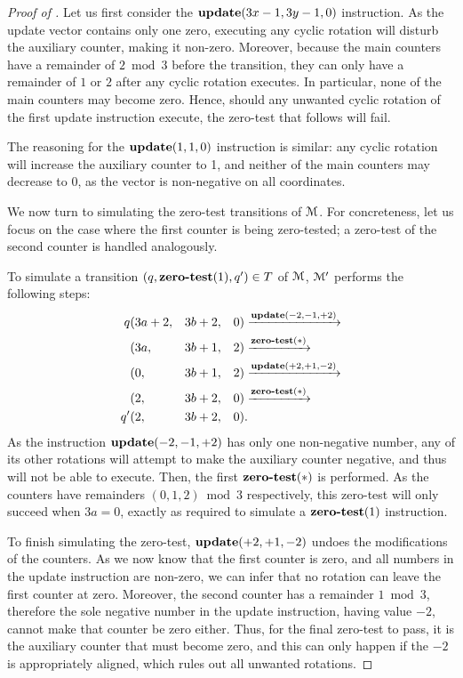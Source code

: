 \begin{proof}[Proof of ]
Let us first consider the $\textbf{update}(3x-1, 3y-1, 0)$ instruction.
As the update vector contains only one zero, executing any cyclic rotation will
disturb the auxiliary counter, making it non-zero.
Moreover, because the main counters have a remainder of $2 \bmod 3$
before the transition, they can only have a remainder of $1$ or $2$ after
any cyclic rotation executes. In particular, none of the main counters may
become zero.
Hence, should any unwanted cyclic rotation of the first update instruction execute,
the zero-test that follows will fail.

The reasoning for the $\textbf{update}(1, 1, 0)$ instruction is similar:
any cyclic rotation will increase the auxiliary counter to 1,
and neither of the main counters may decrease to 0,
as the vector is non-negative on all coordinates.

We now turn to simulating the zero-test transitions of $\mathcal{M}$.
For concreteness, let us focus on the case where the first counter
is being zero-tested;
a zero-test of the second counter is handled analogously.

To simulate a transition $(q, \textbf{zero-test}(1), q') \in T$ of $\mathcal{M}$,
$\mathcal{M}'$ performs the following steps:
\[ \begin{split}
    q&(3a + 2, && 3b + 2, && 0)
    \xrightarrow{\textbf{update}(-2, -1, +2)} \\
    &(3a, && 3b + 1, && 2)
    \xrightarrow{\textbf{zero-test}(\ast)} \\
    &(0, && 3b + 1, && 2)
    \xrightarrow{\textbf{update}(+2, +1, -2)} \\
    &(2, && 3b + 2, && 0)
    \xrightarrow{\textbf{zero-test}(\ast)} \\
    q'&(2, && 3b + 2, && 0).
\end{split} \]
As the instruction $\textbf{update}(-2, -1, +2)$ has only one non-negative number,
any of its other rotations will attempt to make the auxiliary counter negative,
and thus will not be able to execute. Then, the first $\textbf{zero-test}(\ast)$
is performed. As the counters have remainders $(0, 1, 2) \bmod 3$ respectively,
this zero-test will only succeed when $3a = 0$, exactly as required
to simulate a $\textbf{zero-test}(1)$ instruction.

To finish simulating the zero-test, $\textbf{update}(+2, +1, -2)$ undoes
the modifications of the counters. As we now know that the first counter is
zero, and all numbers in the update instruction are non-zero, we can infer that
no rotation can leave the first counter at zero. Moreover, the second counter
has a remainder $1 \bmod 3$, therefore the sole negative number in the update
instruction, having value $-2$, cannot
make that counter be zero either. Thus, for the final zero-test to pass,
it is the auxiliary counter that must become zero, and this can only happen
if the $-2$ is appropriately aligned, which rules out all unwanted rotations.
\end{proof}



